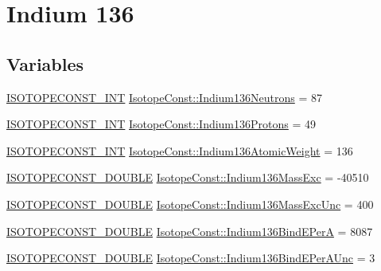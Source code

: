 \hypertarget{group___isotope_const-_indium-_in136}{}\section{Indium 136}
\label{group___isotope_const-_indium-_in136}
\subsection*{Variables}
\begin{DoxyCompactItemize}
\item 
\mbox{\hyperlink{group___isotope_const-_macros_ga5f18360b3e99483a35c32d789e62621c}{I\+S\+O\+T\+O\+P\+E\+C\+O\+N\+S\+T\+\_\+\+I\+NT}} \mbox{\hyperlink{group___isotope_const-_indium-_in136_gaae00d2fa56df0d9adaa161379e2c3666}{Isotope\+Const\+::\+Indium136\+Neutrons}} = 87
\item 
\mbox{\hyperlink{group___isotope_const-_macros_ga5f18360b3e99483a35c32d789e62621c}{I\+S\+O\+T\+O\+P\+E\+C\+O\+N\+S\+T\+\_\+\+I\+NT}} \mbox{\hyperlink{group___isotope_const-_indium-_in136_gabed71ba144465bfb722ce0ed5a4123a3}{Isotope\+Const\+::\+Indium136\+Protons}} = 49
\item 
\mbox{\hyperlink{group___isotope_const-_macros_ga5f18360b3e99483a35c32d789e62621c}{I\+S\+O\+T\+O\+P\+E\+C\+O\+N\+S\+T\+\_\+\+I\+NT}} \mbox{\hyperlink{group___isotope_const-_indium-_in136_ga907eeca22e1cc11635290a6c4a50c3d5}{Isotope\+Const\+::\+Indium136\+Atomic\+Weight}} = 136
\item 
\mbox{\hyperlink{group___isotope_const-_macros_ga8f45a7272ce02c0b4c65c44636ed719a}{I\+S\+O\+T\+O\+P\+E\+C\+O\+N\+S\+T\+\_\+\+D\+O\+U\+B\+LE}} \mbox{\hyperlink{group___isotope_const-_indium-_in136_gab5542a04abdf0f323057d2d50a414bac}{Isotope\+Const\+::\+Indium136\+Mass\+Exc}} = -\/40510
\item 
\mbox{\hyperlink{group___isotope_const-_macros_ga8f45a7272ce02c0b4c65c44636ed719a}{I\+S\+O\+T\+O\+P\+E\+C\+O\+N\+S\+T\+\_\+\+D\+O\+U\+B\+LE}} \mbox{\hyperlink{group___isotope_const-_indium-_in136_gaa9d65f0eafdd80075453eef1167d2973}{Isotope\+Const\+::\+Indium136\+Mass\+Exc\+Unc}} = 400
\item 
\mbox{\hyperlink{group___isotope_const-_macros_ga8f45a7272ce02c0b4c65c44636ed719a}{I\+S\+O\+T\+O\+P\+E\+C\+O\+N\+S\+T\+\_\+\+D\+O\+U\+B\+LE}} \mbox{\hyperlink{group___isotope_const-_indium-_in136_ga6c7b653d6bc47130a6fdfd2e40d37dad}{Isotope\+Const\+::\+Indium136\+Bind\+E\+PerA}} = 8087
\item 
\mbox{\hyperlink{group___isotope_const-_macros_ga8f45a7272ce02c0b4c65c44636ed719a}{I\+S\+O\+T\+O\+P\+E\+C\+O\+N\+S\+T\+\_\+\+D\+O\+U\+B\+LE}} \mbox{\hyperlink{group___isotope_const-_indium-_in136_ga37de877c5ff5f1e94f40e58146874624}{Isotope\+Const\+::\+Indium136\+Bind\+E\+Per\+A\+Unc}} = 3

\end{DoxyCompactItemize}
